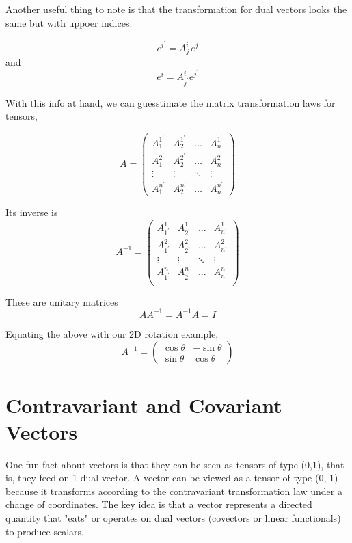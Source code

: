 Another useful thing to note is that the transformation for dual vectors looks the same but with uppoer indices.

$$
e^{i^\prime} = A_{j}^{i^\prime} e^j
$$
and
$$
e^{i} = A_{j^\prime}^{i} e^{j^\prime}
$$

With this info at hand, we can guesstimate the matrix transformation laws for tensors,

$$
A =
\begin{pmatrix}
A_{1}^{1^\prime} & A_{2}^{1^\prime} & \dots  & A_{n}^{1^\prime} \\
A_{1}^{2^\prime} & A_{2}^{2^\prime} & \dots  & A_{n}^{2^\prime} \\
\vdots           & \vdots           & \ddots & \vdots           \\
A_{1}^{n^\prime} & A_{2}^{n^\prime} & \dots  & A_{n}^{n^\prime}
\end{pmatrix}
$$

Its inverse is
$$
A^{-1}
=
\begin{pmatrix}
A_{1^\prime}^{1} & A_{2^\prime}^{1} & \dots  & A_{n^\prime}^{1} \\
A_{1^\prime}^{2} & A_{2^\prime}^{2} & \dots  & A_{n^\prime}^{2} \\
\vdots           & \vdots           & \ddots & \vdots           \\
A_{1^\prime}^{n} & A_{2^\prime}^{n} & \dots  & A_{n^\prime}^{n} \\
\end{pmatrix}
$$

These are unitary matrices
$$
A A^{-1} = A^{-1} A = I
$$

Equating the above with our 2D rotation example,
$$
A^{-1}
=
\begin{pmatrix}
\cos\theta & - \sin\theta \\
\sin\theta & \cos\theta
\end{pmatrix}
$$


\section{Contravariant and Covariant Vectors}

One fun fact about vectors is that they can be seen as tensors of type (0,1), that is, they feed
on 1 dual vector.
A vector can be viewed as a tensor of type (0, 1) because it transforms according to the contravariant
transformation law under a change of coordinates. The key idea is that a vector represents a directed
quantity that "eats" or operates on dual vectors (covectors or linear functionals) to produce scalars.

